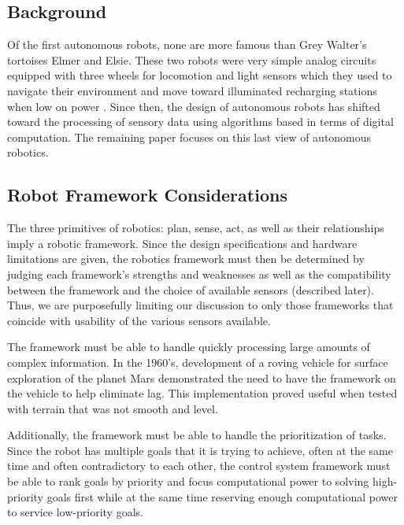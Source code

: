 








\subsection*{Background}
Of the first autonomous robots, none are more famous than Grey Walter's tortoises Elmer and Elsie. These two robots were very simple analog circuits equipped with three wheels for locomotion and light sensors which they used to navigate their environment and move toward illuminated recharging stations when low on power \cite{Walter:1950}. Since then, the design of autonomous robots has shifted toward the processing of sensory data using algorithms based in terms of digital computation. The remaining paper focuses on this last view of autonomous robotics.

\subsection*{Robot Framework Considerations}
The three primitives of robotics: plan, sense, act, as well as their relationships imply a robotic framework. Since the design specifications and hardware limitations are given, the robotics framework must then be determined by judging each framework's strengths and weaknesses as well as the compatibility between the framework and the choice of available sensors (described later). Thus, we are purposefully limiting our discussion to only those frameworks that coincide with usability of the various sensors available.

The framework must be able to handle quickly processing large amounts of complex information. In the 1960's, development of a roving vehicle for surface exploration of the planet Mars demonstrated the need to have the framework on the vehicle to help eliminate lag. This implementation proved useful when tested with terrain that was not smooth and level. \cite{Hogle}

Additionally, the framework must be able to handle the prioritization of tasks. Since the robot has multiple goals that it is trying to achieve, often at the same time and often contradictory to each other, the control system framework must be able to rank goals by priority and focus computational power to solving high-priority goals first while at the same time reserving enough computational power to service low-priority goals.

